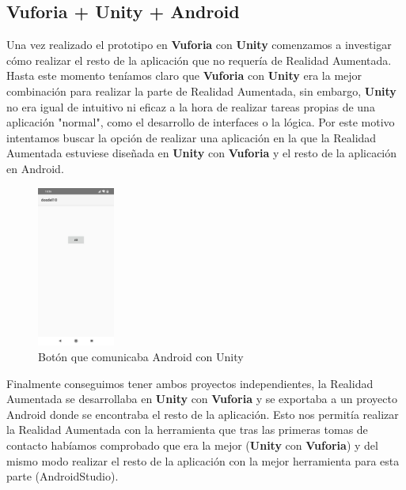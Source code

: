 \subsection{Vuforia + Unity + Android} 
\label{makereference3.6.5}
\begin{flushleft}
Una vez realizado el prototipo en \textbf{Vuforia} con \textbf{Unity} comenzamos a investigar cómo realizar el resto de la aplicación que no requería de Realidad Aumentada.
\break
Hasta este momento teníamos claro que \textbf{Vuforia} con \textbf{Unity} era la mejor combinación para realizar la parte de Realidad Aumentada, sin embargo, \textbf{Unity} no era igual de intuitivo ni eficaz a la hora de realizar tareas propias de una aplicación "normal", como el desarrollo de interfaces o la lógica.
\break
Por este motivo intentamos buscar la opción de realizar una aplicación en la que la Realidad Aumentada estuviese diseñada en \textbf{Unity} con \textbf{Vuforia} y el resto de la aplicación en Android.
\end{flushleft}
\begin{figure}[H]
        \centering
        \includegraphics[width=1in]{figures/androidUnityVuforia.jpg}
        \caption{Botón que comunicaba Android con Unity}
\end{figure}
\begin{flushleft}
    Finalmente conseguimos tener ambos proyectos independientes, la Realidad Aumentada se desarrollaba en \textbf{Unity} con \textbf{Vuforia} y se exportaba a un proyecto Android donde se encontraba el resto de la aplicación.
    Esto nos permitía realizar la Realidad Aumentada con la herramienta que tras las primeras tomas de contacto habíamos comprobado que era la mejor (\textbf{Unity} con \textbf{Vuforia}) y del mismo modo realizar el resto de la aplicación con la mejor herramienta para esta parte (AndroidStudio).
\end{flushleft}
